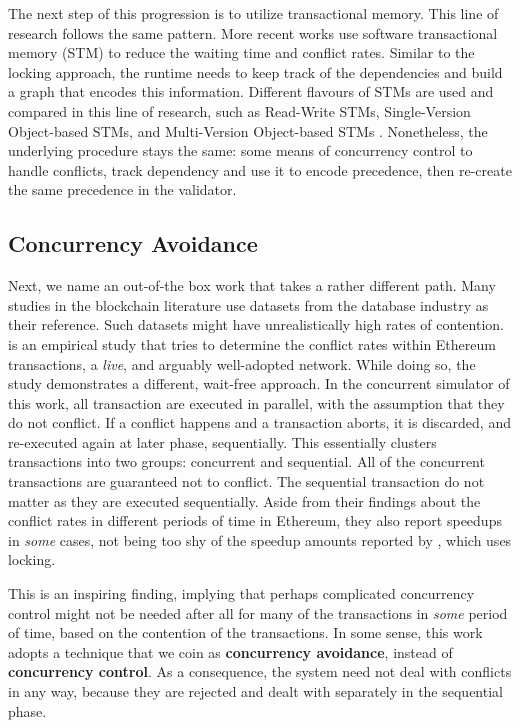 The next step of this progression is to utilize transactional memory. This line of research follows
the same pattern. More recent works use software transactional memory (STM) to reduce the waiting
time and conflict rates. Similar to the locking approach, the runtime needs to keep track of the
dependencies and build a graph that encodes this information. Different flavours of STMs are used
and compared in this line of research, such as Read-Write STMs, Single-Version Object-based STMs,
and Multi-Version Object-based STMs
\cite{anjanaEfficientConcurrentExecution2019,anjanaEfficientFrameworkOptimistic2019}. Nonetheless,
the underlying procedure stays the same: some means of concurrency control to handle conflicts,
track dependency and use it to encode precedence, then re-create the same precedence in the
validator.

\subsection*{Concurrency Avoidance}


Next, we name an out-of-the box work that takes a rather different path. Many studies in the
blockchain literature use datasets from the database industry as their reference. Such datasets
might have unrealistically high rates of contention. \cite{saraphEmpiricalStudySpeculative2019} is
an empirical study that tries to determine the conflict rates within Ethereum transactions, a
\textit{live}, and arguably well-adopted network. While doing so, the study demonstrates a
different, wait-free approach. In the concurrent simulator of this work, all transaction are
executed in parallel, with the assumption that they do not conflict. If a conflict happens and a
transaction aborts, it is discarded, and re-executed again at later phase, sequentially. This
essentially clusters transactions into two groups: concurrent and sequential. All of the concurrent
transactions are guaranteed not to conflict. The sequential transaction do not matter as they are
executed sequentially. Aside from their findings about the conflict rates in different periods of
time in Ethereum, they also report speedups in \textit{some} cases, not being too shy of the speedup
amounts reported by \cite{dickersonSmartLocksAddingConcurrency2017}, which uses locking.

This is an inspiring finding, implying that perhaps complicated concurrency control might not be
needed after all for many of the transactions in \textit{some} period of time, based on the
contention of the transactions. In some sense, this work adopts a technique that we coin as
\textbf{concurrency avoidance}, instead of \textbf{concurrency control}. As a consequence, the
system need not deal with conflicts in any way, because they are rejected and dealt with separately
in the sequential phase.

